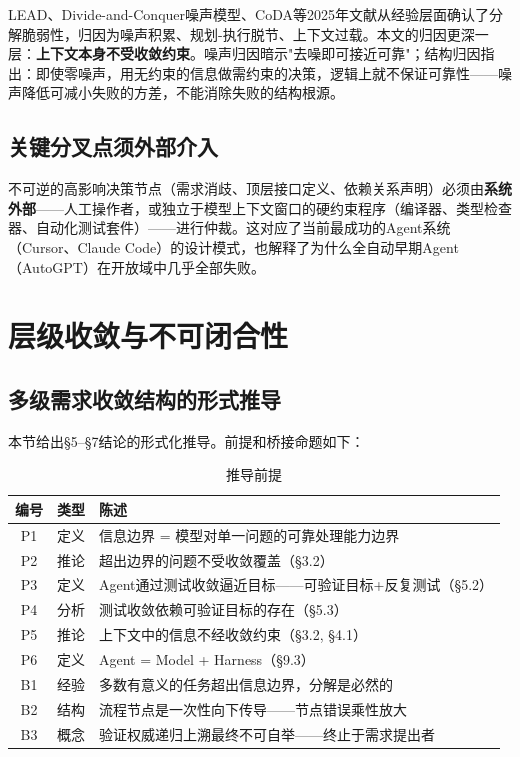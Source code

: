 \documentclass[11pt,a4paper]{ctexart}
\begin{document}
LEAD\cite{LEAD2025}、Divide-and-Conquer噪声模型、CoDA等2025年文献从经验层面确认了分解脆弱性，归因为噪声积累、规划-执行脱节、上下文过载。本文的归因更深一层：\textbf{上下文本身不受收敛约束}。噪声归因暗示"去噪即可接近可靠"；结构归因指出：即使零噪声，用无约束的信息做需约束的决策，逻辑上就不保证可靠性——噪声降低可减小失败的方差，不能消除失败的结构根源。

\subsection{关键分叉点须外部介入}

不可逆的高影响决策节点（需求消歧、顶层接口定义、依赖关系声明）必须由\textbf{系统外部}——人工操作者，或独立于模型上下文窗口的硬约束程序（编译器、类型检查器、自动化测试套件）——进行仲裁。这对应了当前最成功的Agent系统（Cursor、Claude Code）的设计模式，也解释了为什么全自动早期Agent（AutoGPT）在开放域中几乎全部失败。


\section{层级收敛与不可闭合性}

\subsection{多级需求收敛结构的形式推导}

本节给出§5--§7结论的形式化推导。前提和桥接命题如下：

\begin{table}[htbp]
\centering
\caption{推导前提}
\label{tab:premises}
\begin{tabular}{@{}ccl@{}}
\toprule
\textbf{编号} & \textbf{类型} & \textbf{陈述} \\
\midrule
P1 & 定义 & 信息边界 = 模型对单一问题的可靠处理能力边界 \\
P2 & 推论 & 超出边界的问题不受收敛覆盖（§3.2） \\
P3 & 定义 & Agent通过测试收敛逼近目标——可验证目标+反复测试（§5.2） \\
P4 & 分析 & 测试收敛依赖可验证目标的存在（§5.3） \\
P5 & 推论 & 上下文中的信息不经收敛约束（§3.2, §4.1） \\
P6 & 定义 & Agent = Model + Harness（§9.3） \\
\midrule
B1 & 经验 & 多数有意义的任务超出信息边界，分解是必然的 \\
B2 & 结构 & 流程节点是一次性向下传导——节点错误乘性放大 \\
B3 & 概念 & 验证权威递归上溯最终不可自举——终止于需求提出者 \\
\bottomrule
\end{tabular}
\end{table}
\end{document}
